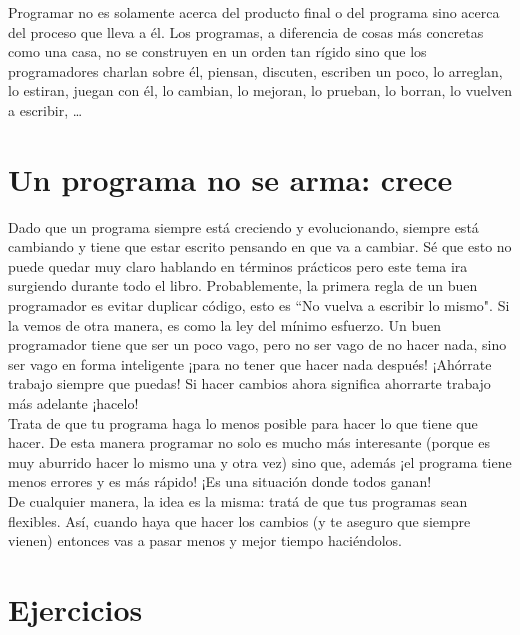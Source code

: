 Programar no es solamente acerca del producto final o del programa sino acerca del proceso que lleva a él. Los programas, a diferencia de cosas más concretas como una casa, no se construyen en un orden tan rígido sino que los programadores charlan sobre él, piensan, discuten, escriben un poco, lo arreglan, lo estiran, juegan con él, lo cambian, lo mejoran, lo prueban, lo borran, lo vuelven a escribir, \ldots

\section{Un programa no se arma: crece}
Dado que un programa siempre está creciendo y evolucionando, siempre está cambiando y tiene que estar escrito pensando en que va a cambiar. Sé que esto no puede quedar muy claro hablando en términos prácticos pero este tema ira surgiendo durante todo el libro. Probablemente, la primera regla de un buen programador es evitar duplicar código, esto es ``No vuelva a escribir lo mismo". Si la vemos de otra manera, es como la ley del mínimo esfuerzo. Un buen programador tiene que ser un poco vago, pero no ser vago de no hacer nada, sino ser vago en forma inteligente ¡para no tener que hacer nada después! ¡Ahórrate trabajo siempre que puedas! Si hacer cambios ahora significa ahorrarte trabajo más adelante ¡hacelo!\\

Trata de que tu programa haga lo menos posible para hacer lo que tiene que hacer. De esta manera programar no solo es mucho más interesante (porque es muy aburrido hacer lo mismo una y otra vez) sino que, además ¡el programa tiene menos errores y es más rápido! ¡Es una situación donde todos ganan!\\

De cualquier manera, la idea es la misma: tratá de que tus programas sean flexibles. Así, cuando haya que hacer los cambios (y te aseguro que siempre vienen) entonces vas a pasar menos y mejor tiempo haciéndolos.\\

\section{Ejercicios}
